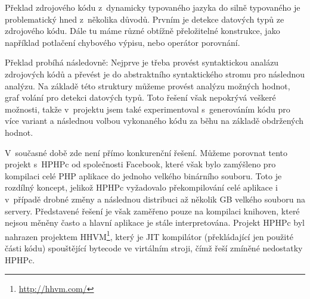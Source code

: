 \documentclass[czech]{ExcelAtFIT}
\begin{document}
		Překlad zdrojového kódu z~dynamicky typovaného jazyka do silně typovaného je problematický hned z~několika důvodů. Prvním je detekce datových typů ze zdrojového kódu. Dále tu máme různé obtížně přeložitelné konstrukce, jako například potlačení chybového výpisu, nebo operátor porovnání.


		Překlad probíhá následovně: Nejprve je třeba pro\-vést syntaktickou analázu zdrojových kódů a převést je do abstraktního syntaktického stromu pro následnou analýzu. Na základě této struktury můžeme provést analýzu možných hodnot, graf volání pro detekci datových typů. Toto řešení však nepokrývá veškeré možnosti, takže v~projektu jsem také experimentoval s~generováním kódu pro více variant a následnou volbou vykonaného kódu za běhu na základě obdržených hodnot.







		V~současné době zde není přímo konkurenční ře\-še\-ní. Můžeme porovnat tento projekt s~HPHPc od společnosti Facebook, které však bylo zamýšleno pro kompilaci celé PHP aplikace do jednoho velkého bi\-nár\-ní\-ho sou\-bo\-ru. Toto je rozdílný koncept, jelikož HPHPc vy\-ža\-do\-va\-lo překompilování celé aplikace i v~případě drobné změny a následnou distribuci až několik GB velkého souboru na servery. Představené řešení je však zaměřeno pouze na kompilaci knihoven, které nejsou měněny často a hlavní aplikace je stále interpretována. Projekt HPHPc byl nahrazen projektem HHVM\footnote{\url{http://hhvm.com/}}, který je JIT kompilátor (překládající jen použité části kódu) spouštějící bytecode ve virtálním stroji, čímž řeší zmíněné nedostatky HPHPc\cite{hphpcHipHop}.
\end{document}

